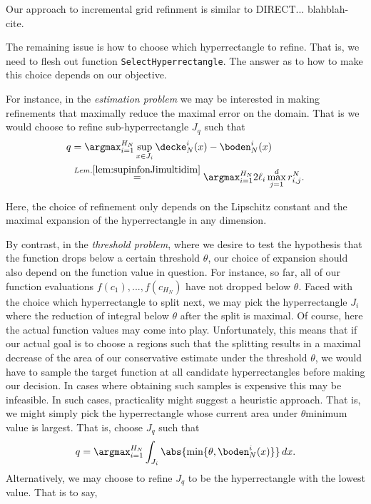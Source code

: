 Our approach to incremental grid refinment is similar to DIRECT... blahblah-cite.

The remaining issue is how to choose which hyperrectangle to refine. That is, we need to flesh out function 
\texttt{SelectHyperrectangle}. The answer as to how to make this choice depends on our objective. 

For instance, in the \textit{ estimation problem} we may be interested in making refinements that maximally reduce the maximal error on the domain.
That is we would choose to refine sub-hyperrectangle $J_q$ such that  
\begin{align}
q &= \argmax_{i=1}^{H_N} \sup_{x \in J_i} \decke_N^i (x) - \boden_N^i(x) \\
& \stackrel{Lem. \ref{lem:supinfonJimultidim}}{=} \argmax_{i=1}^{H_N} 2 \ell_i \max_{j=1}^d r_{i,j}^N.
\end{align}

Here, the choice of refinement only depends on the Lipschitz constant and the maximal expansion of the hyperrectangle in any dimension.

By contrast, in the \emph{threshold problem}, where we desire to test the hypothesis that the function drops below a certain threshold $\theta$, our choice of expansion should also depend on the function value in question. For instance, so far, all of our function evaluations $f(c_1),...,f(c_{H_N})$ have not dropped below $\theta$. Faced with the choice which hyperrectangle to split next, we may pick the hyperrectangle $J_i$ where the reduction of integral below $\theta$ after the split is maximal. Of course, here the actual function values may come into play. Unfortunately, this means that if our actual goal is to choose a regions such that the splitting results in a maximal decrease of the area of our conservative estimate under the threshold $\theta$, we would have to sample the target function at all candidate hyperrectangles before making our decision. In cases where obtaining such samples is expensive this may be infeasible. In such cases, practicality might suggest a heuristic approach. That is, we might simply pick the hyperrectangle whose current area under $\theta$minimum value is largest. That is, choose $J_q$ such that
\begin{align}
q &= \argmax_{i=1}^{H_N} \int_{J_i} \abs{\min\{ \theta, \boden_N^i(x)\}} \, dx. \\
\end{align}
Alternatively, we may choose to refine $J_q$ to be the hyperrectangle with the lowest value. That is to say,

